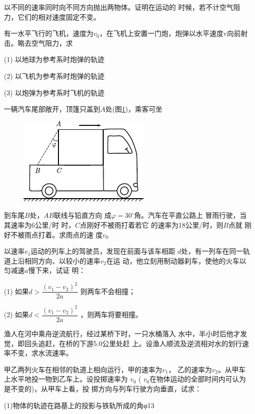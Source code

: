 \exercises

\exercise 以不同的速率同时向不同方向抛出两物体。证明在运动的
时候，若不计空气阻力，它们的相对速度固定不变。

\exercise 有一水平飞行的飞机，速度为$ v _ { 0 }$，在飞机上安置一门炮，炮弹以水平速度v向前射击。略去空气阻力，求

(1) 以地球为参考系时炮弹的轨迹

(2) 以飞机为参考系时炮弹的轨迹

(3) 以炮弹为参考系时飞机的轨迹

\exercise 一辆汽车尾部敞开，顶篷只盖到$A$处(图\ref{fig:02.17})，乘客可坐
\begin{figure}
    \includegraphics{figure/fig02.17}
    \caption{}
    \label{fig:02.17}
\end{figure}
到车尾$B$处，$AB$联线与铅直方向
成$ \varphi = 3 0 ^ { \circ }  $角。汽车在平直公路上
冒雨行驶，当其速率为6公里/时
时，$C$点刚好不被雨打着若它
的速率为18公里/时，则$B$点就
刚好不被雨点打着。求雨点的速
度$ v _ { 0 }$

\exercise 以速率$ v _ { 1 }  $运动的列车上的驾驶员，发现在前面与该车相距
$d$处，有一列车在同一轨道上沿相同方向、以较小的速率$v_2$在运
动，他立刻用制动器刹车，使他的火车以匀减速$a$慢下来，试证
明：

(1) 如果$d > \dfrac { ( v _ { 1 } - v _ { 2 } ) ^ { 2 } } { 2 a }$
则两车不会相撞；

(2) 如果$d < \dfrac { ( v _ { 1 } - v _ { 2 } ) ^ { 2 } } { 2 a }$
，则两车将要相撞。

\exercise 渔人在河中乘舟逆流航行，经过某桥下时，一只水桶落入
水中，半小时后他才发觉，即回头追赶，在桥的下游5.0公里处赶
上。设渔人顺流及逆流相对水的划行速率不变，求水流速率。

\exercise 甲乙两列火车在相邻的轨道上相向运行，甲的速率为$v_1$，
乙的速率为$v_2$。从甲车上水平地投一物到乙车上。设投掷速率为
$v _ { 0 }$ ( $v_0  $在物体运动的全部时间内可认为是不变的)，从甲车上看，投
掷方向与列车行驶方向垂直，试求：

(1)物体的轨迹在路基上的投影与铁轨所成的角φ13


